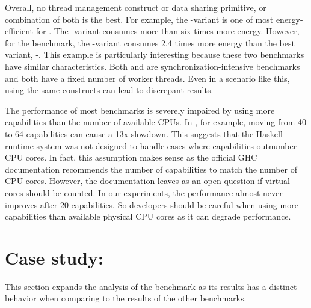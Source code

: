  Overall, no thread management construct or data sharing primitive, or combination of both is the best. For example, the \forkIO-\TMVar variant is one of most energy-efficient for \dining. The \forkOS-\TMVar variant consumes more than six times more energy. However, for the \chameneos benchmark, the \forkIO-\TMVar variant consumes 2.4 times more energy than the best variant, \forkIO-\MVar. This example is particularly interesting because these two benchmarks have similar characteristics. Both \dining and \chameneos are synchronization-intensive benchmarks and both have a fixed number of worker threads. Even in a scenario like this, using the same constructs can lead to discrepant results.
\newline

 The performance of most benchmarks is severely impaired by using more capabilities than the number of available CPUs. In \chameneos, for example, moving from 40 to 64 capabilities can cause a 13x slowdown. This suggests that the Haskell runtime system was not designed to handle cases where capabilities outnumber CPU cores. In fact, this assumption makes sense as the official GHC documentation recommends the number of capabilities to match the number of CPU cores. However, the documentation leaves as an open question if virtual cores should be counted. In our experiments, the performance almost never improves after 20 capabilities. So developers should be careful when using more capabilities than available physical CPU cores as it can degrade performance.


\section{Case study: \fasta}
This section expands the analysis of the \fasta benchmark as its results has a distinct behavior when comparing to the results of the other benchmarks.

